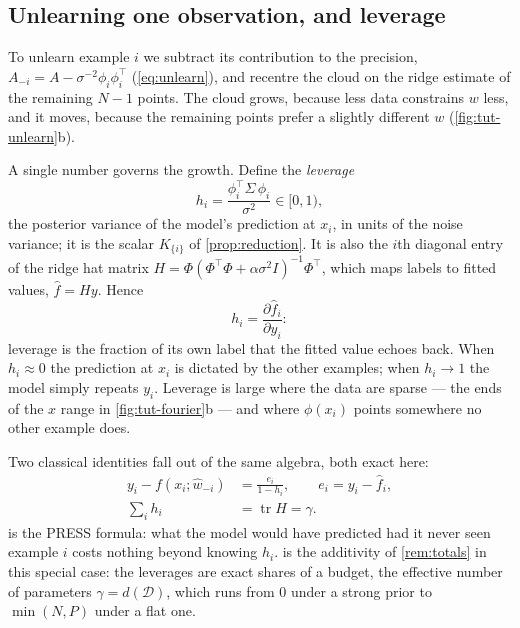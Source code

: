 \documentclass[10pt,twocolumn,letterpaper]{article}
\theoremstyle{definition}
\newcommand{\tr}{\operatorname{tr}}
\newcommand{\D}{\mathcal{D}}
\newcommand{\T}{^{\top}}
\newcommand{\dof}{d}
\begin{document}
\subsection{Unlearning one observation, and leverage}
To unlearn example $i$ we subtract its contribution to the precision, $A_{-i}=A-\sigma^{-2}\phi_i\phi_i\T$ (\cref{eq:unlearn}), and recentre the cloud on the ridge estimate of the remaining $N-1$ points. The cloud grows, because less data constrains $w$ less, and it moves, because the remaining points prefer a slightly different $w$ (\cref{fig:tut-unlearn}b).

A single number governs the growth. Define the \emph{leverage}
\begin{equation}
h_i=\frac{\phi_i\T\Sigma\,\phi_i}{\sigma^2}\in[0,1),
\label{eq:tut-lev}
\end{equation}
the posterior variance of the model's prediction at $x_i$, in units of the noise variance; it is the scalar $K_{\{i\}}$ of \cref{prop:reduction}. It is also the $i$th diagonal entry of the ridge hat matrix $H=\Phi(\Phi\T\Phi+\alpha\sigma^2I)^{-1}\Phi\T$, which maps labels to fitted values, $\hat f=Hy$. Hence
\begin{equation}
h_i=\frac{\partial \hat f_i}{\partial y_i}:
\end{equation}
leverage is the fraction of its own label that the fitted value echoes back. When $h_i\approx0$ the prediction at $x_i$ is dictated by the other examples; when $h_i\to1$ the model simply repeats $y_i$. Leverage is large where the data are sparse --- the ends of the $x$ range in \cref{fig:tut-fourier}b --- and where $\phi(x_i)$ points somewhere no other example does.

Two classical identities fall out of the same algebra, both exact here:
\begin{align}
y_i-f(x_i;\hat w_{-i})&=\frac{e_i}{1-h_i},\qquad e_i=y_i-\hat f_i,\label{eq:tut-press}\\
\textstyle\sum_i h_i&=\tr H=\gamma.\label{eq:tut-gamma}
\end{align}
 is the PRESS formula: what the model would have predicted had it never seen example $i$ costs nothing beyond knowing $h_i$.  is the additivity of \cref{rem:totals} in this special case: the leverages are exact shares of a budget, the effective number of parameters $\gamma=\dof(\D)$, which runs from $0$ under a strong prior to $\min(N,P)$ under a flat one.
\end{document}
